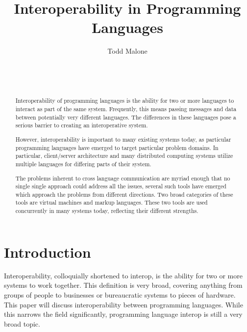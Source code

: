 \documentclass{sig-alternate}
\begin{document}

\title{Interoperability in Programming Languages}


\author{
\alignauthor
Todd Malone\\
	\\
	\\
	\\
}

\maketitle
\begin{abstract}
Interoperability of programming languages is the ability for two or more languages to interact as part of the same system. Frequently, this means passing messages and data between potentially very different languages.
The differences in these languages pose a serious barrier to creating an interoperative system.

However, interoperability is important to many existing systems today, as particular programming languages have emerged to target particular problem domains. In particular, client/server architecture and many distributed computing systems utilize multiple languages for differing parts of their system.


The problems inherent to cross language communication are myriad enough that no single single approach could address all the issues, several such tools have emerged which approach the problems from different directions.
Two broad categories of these tools are virtual machines and markup languages. These two tools are used concurrently in many systems today, reflecting their different strengths.
\end{abstract}


\section{Introduction}
Interoperability, colloquially shortened to interop, is the ability for two or more systems to work together. This definition is very broad, covering anything from groups of people to businesses or bureaucratic systems to pieces of hardware. This paper will discuss interoperability between programming languages. While this narrows the field significantly, programming language interop is still a very broad topic.
\end{document}
